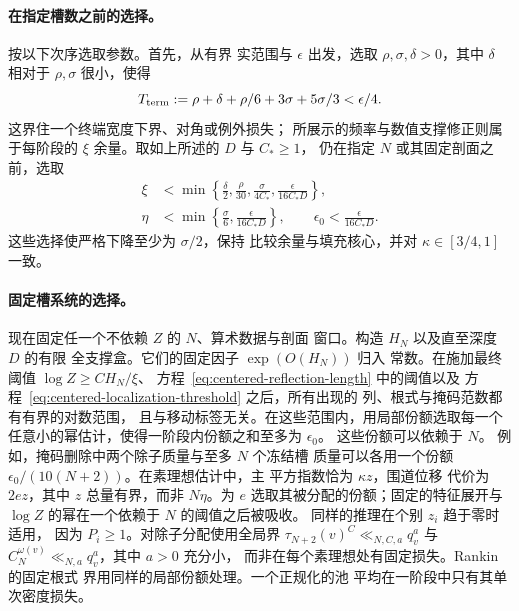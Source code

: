 \paragraph{在指定槽数之前的选择。}
按以下次序选取参数。首先，从有界
实范围与 \(\epsilon\) 出发，选取 \(\rho,\sigma,\delta>0\)，其中
\(\delta\) 相对于 \(\rho,\sigma\) 很小，使得
\[
 T_{\rm term}:=\rho+\delta+\rho/6+3\sigma+5\sigma/3<\epsilon/4.
\]
这界住一个终端宽度下界、对角或例外损失；
所展示的频率与数值支撑修正则属于每阶段的
\(\xi\) 余量。取如上所述的 \(D\) 与 \(C_*\ge1\)，
仍在指定 \(N\) 或其固定剖面之前，选取
\begin{equation}
 \begin{aligned}
 \xi&<\min\left\{\frac\delta2,\frac\rho{30},
                  \frac{\sigma}{4C_*},
                  \frac{\epsilon}{16C_*D}\right\},\\
 \eta&<\min\left\{\frac\sigma6,
                   \frac{\epsilon}{16C_*D}\right\},\qquad
 \epsilon_0<\frac{\epsilon}{16C_*D}.
 \end{aligned}
 \label{old-eq:2.1i}
\end{equation}
这些选择使严格下降至少为 \(\sigma/2\)，保持
比较余量与填充核心，并对
\(\kappa\in[3/4,1]\) 一致。

\paragraph{固定槽系统的选择。}
现在固定任一个不依赖 \(Z\) 的 \(N\)、算术数据与剖面
窗口。构造 \(H_N\) 以及直至深度 \(D\) 的有限
全支撑盒。它们的固定因子 \(\exp(O(H_N))\) 归入
常数。在施加最终阈值
\(\log Z\ge C H_N/\xi\)、
方程~\eqref{eq:centered-reflection-length} 中的阈值以及
方程~\eqref{eq:centered-localization-threshold} 之后，所有出现的
列、根式与掩码范数都有有界的对数范围，
且与移动标签无关。在这些范围内，用局部份额选取每一个
任意小的幂估计，使得一阶段内份额之和至多为 \(\epsilon_0\)。
这些份额可以依赖于 \(N\)。
例如，掩码删除中两个除子质量与至多 \(N\) 个冻结槽
质量可以各用一个份额
\(\epsilon_0/(10(N+2))\)。在素理想估计中，主
平方指数恰为 \(\kappa z\)，围道位移
代价为 \(2e z\)，其中 \(z\) 总量有界，而非 \(N\eta\)。为
\(e\) 选取其被分配的份额；固定的特征展开与
\(\log Z\) 的幂在一个依赖于 \(N\) 的阈值之后被吸收。
同样的推理在个别 \(z_i\) 趋于零时适用，
因为 \(P_i\ge1\)。对除子分配使用全局界
\(\tau_{N+2}(v)^C\ll_{N,C,a}q_v^a\) 与
\(C_N^{\omega(v)}\ll_{N,a}q_v^a\)，其中 \(a>0\) 充分小，
而非在每个素理想处有固定损失。Rankin 的固定根式
界用同样的局部份额处理。一个正规化的池
平均在一阶段中只有其单次密度损失。

